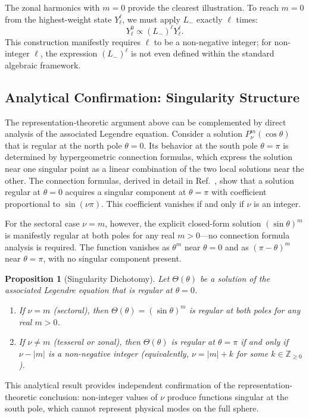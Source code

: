 \documentclass[
  aip,
  amsmath,amssymb,
  preprint
]{revtex4-1}
\newtheorem{proposition}[theorem]{Proposition}
\begin{document}
The zonal harmonics with $m = 0$ provide the clearest illustration. To reach $m = 0$ from the highest-weight state $Y_\ell^\ell$, we must apply $L_-$ exactly $\ell$ times:
\begin{equation}
Y_\ell^0 \propto (L_-)^\ell Y_\ell^\ell.
\label{eq:zonal_construction}
\end{equation}
This construction manifestly requires $\ell$ to be a non-negative integer; for non-integer $\ell$, the expression $(L_-)^\ell$ is not even defined within the standard algebraic framework.


\subsection{Analytical Confirmation: Singularity Structure}
\label{subsec:singularity}
The representation-theoretic argument above can be complemented by direct analysis of the associated Legendre equation. Consider a solution $P_\nu^m(\cos\theta)$ that is regular at the north pole $\theta = 0$. Its behavior at the south pole $\theta = \pi$ is determined by hypergeometric connection formulas, which express the solution near one singular point as a linear combination of the two local solutions near the other. The connection formulas, derived in detail in Ref.~\cite{BakrAmari2025}, show that a solution regular at $\theta = 0$ acquires a singular component at $\theta = \pi$ with coefficient proportional to $\sin(\nu\pi)$. This coefficient vanishes if and only if $\nu$ is an integer.

For the sectoral case $\nu = m$, however, the explicit closed-form solution $(\sin\theta)^m$ is manifestly regular at both poles for any real $m > 0$---no connection formula analysis is required. The function vanishes as $\theta^m$ near $\theta = 0$ and as $(\pi - \theta)^m$ near $\theta = \pi$, with no singular component present.

\begin{proposition}[Singularity Dichotomy]
\label{prop:singularity}
Let $\Theta(\theta)$ be a solution of the associated Legendre equation that is
regular at $\theta = 0$.
\begin{enumerate}
\renewcommand{\theenumi}{\roman{enumi}}
\renewcommand{\labelenumi}{(\theenumi)}
\item If $\nu = m$ (sectoral), then $\Theta(\theta) = (\sin\theta)^m$ is regular at
both poles for any real $m>0$.
\item If $\nu \neq m$ (tesseral or zonal), then $\Theta(\theta)$ is regular at $\theta=\pi$
if and only if $\nu - |m|$ is a non-negative integer (equivalently, $\nu = |m| + k$
for some $k \in \mathbb{Z}_{\ge 0}$).
\end{enumerate}
\end{proposition}
This analytical result provides independent confirmation of the representation-theoretic conclusion: non-integer values of $\nu$ produce functions singular at the south pole, which cannot represent physical modes on the full sphere.
\end{document}
